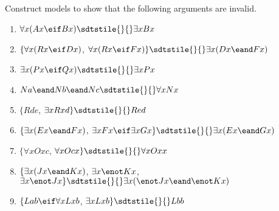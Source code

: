 \problempart
Construct models to show that the following arguments are invalid.
\begin{enumerate}[label=\arabic*), topsep=0pt, parsep=0pt, itemsep=3pt]
\item $\forall x(Ax \eif Bx) \sdtstile{}{} \exists x Bx$
\item $\{\forall x(Rx \eif Dx)$, $\forall x(Rx \eif Fx)\} \sdtstile{}{} \exists x(Dx \eand Fx)$
\item $\exists x(Px\eif Qx) \sdtstile{}{} \exists x Px$
\item $Na \eand Nb \eand Nc \sdtstile{}{}  \forall x Nx$
\item $\{Rde$, $\exists x Rxd\} \sdtstile{}{} Red$
\item $\{\exists x(Ex \eand Fx)$, $\exists x Fx \eif \exists x Gx\} \sdtstile{}{} \exists x(Ex \eand Gx)$
\item $\{\forall x Oxc$, $\forall x Ocx\} \sdtstile{}{} \forall x Oxx$
\item $\{\exists x(Jx \eand Kx)$, $\exists x \enot Kx$, $\exists x \enot Jx\} \sdtstile{}{} \exists x(\enot Jx \eand \enot Kx)$
\item $\{Lab \eif \forall x Lxb$, $\exists x Lxb\} \sdtstile{}{} Lbb$
\end{enumerate}




